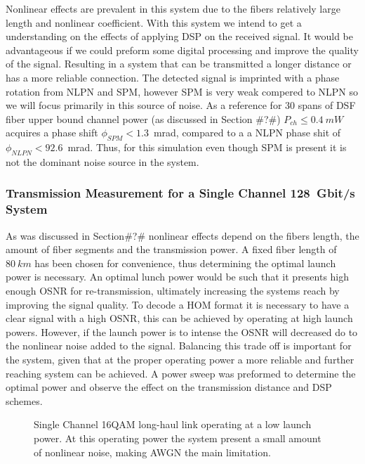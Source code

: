 Nonlinear effects are prevalent in this system due to the fibers relatively large length and nonlinear coefficient. With this system we intend to get a understanding on the effects of applying DSP on the received signal. It would be advantageous if we could preform some digital processing and improve the quality of the signal. Resulting in a system that can be transmitted a longer distance or has a more reliable connection. The detected signal is imprinted with a phase rotation from NLPN and SPM, however SPM is very weak compered to NLPN so we will focus primarily in this source of noise. As a reference for 30 spans of DSF fiber  upper bound channel power (as discussed in Section \#?\#) $P_{ch}\le0.4~mW$  acquires a phase shift $\phi_{SPM}< 1.3$~mrad, compared to a a NLPN phase shit of $\phi_{NLPN}< 92.6$~mrad. Thus, for this simulation even though SPM is present it is not the dominant noise source in the system.  


  
\subsubsection{Transmission Measurement for a Single Channel 128~Gbit/s  System}

As was discussed in Section\#?\# nonlinear effects depend on the fibers length, the amount of fiber segments and the transmission power. A fixed fiber length of $80~km$ has been chosen for convenience, thus determining the optimal launch power is necessary. An optimal lunch power would be such that it presents high enough OSNR for re-transmission, ultimately increasing the systems reach by improving the signal quality. To decode a HOM format it is necessary to have a clear signal with a high OSNR, this can be achieved by operating at high launch powers. However, if the launch power is to intense the OSNR will decreased do to the nonlinear noise added to the signal. Balancing this trade off is important for the system, given that at the proper operating power a more reliable and further reaching system can be achieved. A power sweep was preformed to determine the optimal power and observe the effect on the transmission distance and DSP schemes.

\begin{figure}[h]
  \centering
  \qquad
     \qquad
    \caption{Single Channel 16QAM long-haul link operating at a low launch power. At this operating power the system present a small amount of nonlinear noise, making AWGN the main limitation.  }
    \label{fig:lowP}
\end{figure}
 
